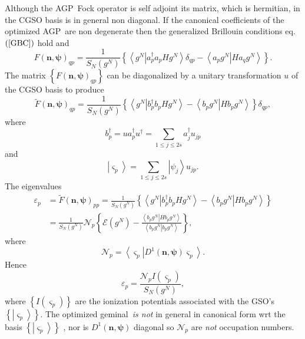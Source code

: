 \documentclass[aps,preprint]{revtex4}%
\begin{document}
Although the AGP\ Fock operator is self adjoint its matrix, which is
hermitian, in the CGSO basis is in general non diagonal. If the canonical
coefficients of the optimized AGP\ are non degenerate then the generalized
Brillouin conditions eq. $\left(  \ref{GBC}\right)  $ hold and
\begin{equation}
F\left(  \mathbf{n},\mathbf{\psi}\right)  _{qp}=\frac{1}{S_{N}\left(
g^{N}\right)  }\left\{  \left\langle \left.  g^{N}\right\vert a_{p}^{\dagger
}a_{p}Hg^{N}\right\rangle \delta_{qp}-\left\langle \left.  a_{p}%
g^{N}\right\vert Ha_{q}g^{N}\right\rangle \right\}  .
\end{equation}
The matrix $\left\{  F\left(  \mathbf{n},\mathbf{\psi}\right)  _{qp}\right\}
$ can be diagonalized by a unitary transformation $u$ of the CGSO basis to
produce
\begin{equation}
\tilde{F}\left(  \mathbf{n},\mathbf{\psi}\right)  _{qp}=\frac{1}{S_{N}\left(
g^{N}\right)  }\left\{  \left\langle \left.  g^{N}\right\vert b_{p}^{\dagger
}b_{p}Hg^{N}\right\rangle -\left\langle \left.  b_{p}g^{N}\right\vert
Hb_{p}g^{N}\right\rangle \right\}  \delta_{qp},
\end{equation}
where
\begin{equation}
b_{p}^{\dagger}=ua_{p}^{\dagger}u^{\dagger}=\sum_{1\leq j\leq2s}a_{j}%
^{\dagger}u_{jp}%
\end{equation}
and
\begin{equation}
\left\vert \varsigma_{p}\right\rangle =\sum_{1\leq j\leq2s}\left\vert \psi
_{j}\right\rangle u_{jp}.
\end{equation}
The eigenvalues
\begin{align}
\varepsilon_{p}  &  =\tilde{F}\left(  \mathbf{n},\mathbf{\psi}\right)
_{pp}=\frac{1}{S_{N}\left(  g^{N}\right)  }\left\{  \left\langle \left.
g^{N}\right\vert b_{p}^{\dagger}b_{p}Hg^{N}\right\rangle -\left\langle \left.
b_{p}g^{N}\right\vert Hb_{p}g^{N}\right\rangle \right\} \nonumber\\
&  =\frac{1}{S_{N}\left(  g^{N}\right)  }\mathcal{N}_{p}\left\{
\mathcal{E}\left(  g^{N}\right)  -\frac{\left\langle \left.  b_{p}%
g^{N}\right\vert Hb_{p}g^{N}\right\rangle }{\left\langle \left.  b_{p}%
g^{N}\right\vert b_{p}g^{N}\right\rangle }\right\}  ,
\end{align}
where
\begin{equation}
\mathcal{N}_{p}=\left\langle \left.  \varsigma_{p}\right\vert D^{1}\left(
\mathbf{n},\mathbf{\psi}\right)  \varsigma_{p}\right\rangle .
\end{equation}
Hence
\begin{equation}
\varepsilon_{p}=\frac{\mathcal{N}_{p}I\left(  \varsigma_{p}\right)  }%
{S_{N}\left(  g^{N}\right)  },
\end{equation}
where $\left\{  I\left(  \varsigma_{p}\right)  \right\}  $ are the ionization
potentials associated with the GSO's $\left\{  \left\vert \varsigma
_{p}\right\rangle \right\}  .$ The optimized geminal\ \emph{is not} in general
in canonical form wrt the basis $\left\{  \left\vert \varsigma_{p}%
\right\rangle \right\}  $ , nor is $D^{1}\left(  \mathbf{n},\mathbf{\psi
}\right)  $ diagonal so $\mathcal{N}_{p}$ are \emph{not} occupation numbers.
\end{document}

